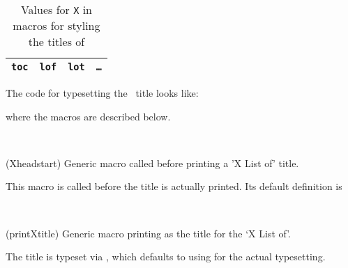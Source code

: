 \begin{table}
\centering
\caption{Values for \texttt{X} in macros for styling the titles of \listofx}
\label{tab:Xlistofxtitles}
\begin{tabular}{cccc}\toprule
\texttt{toc} & \texttt{lof} & \texttt{lot} & \texttt{\ldots} \\
\bottomrule
\end{tabular}
\end{table}

    The code for typesetting the \toc\ title looks like:
\begin{lcode}
\tocheadstart
\printtoctitle{\contentsname}
\tocmark
\thispagestyle{chapter}
\aftertoctitle
\end{lcode}
where the macros are described below.

\begin{syntax}
\cmd{\Xheadstart} \\
\end{syntax}
\glossary(Xheadstart)%
  {}%
  {Generic macro called before printing a 'X List of' title.}
\begin{comment}
\glossary(tocheadstart)%
  {\cs{tocheadstart}}%
  {Called before printing the \prtoc\ title.}
\glossary(lofheadstart)%
  {\cs{lofheadstart}}%
  {Called before printing the \prlof\ title.}
\glossary(lotheadstart)%
  {\cs{lotheadstart}}%
  {Called before printing the \prlot\ title.}
\end{comment}
This macro is called before the title is actually printed.
Its default definition is
\begin{lcode}
\newcommand{\Xheadstart}{\chapterheadstart}
\end{lcode}

\begin{syntax}
\cmd{\printXtitle} \\
\end{syntax}
\glossary(printXtitle)%
  {}%
  {Generic macro printing  as the title for the `X List of'.}
\begin{comment}
\glossary(printtoctitle)%
  {\cs{printtoctitle}\marg{title}}%
  {Prints \meta{title} as the title for the \prtoc.}
\glossary(printloftitle)%
  {\cs{printloftitle}\marg{title}}%
  {Prints \meta{title} as the title for the \prlof.}
\glossary(printlottitle)%
  {\cs{printlottitle}\marg{title}}%
  {Prints \meta{title} as the title for the \prlot.}
\end{comment}
The title is typeset via \cmd{\printXtitle}, which defaults to
using \cmd{\printchaptertitle} for the actual typesetting. 

